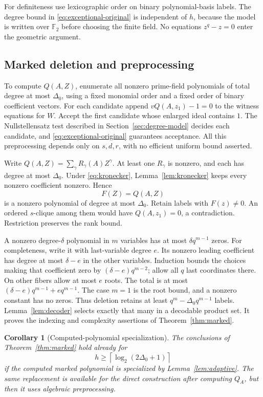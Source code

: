 \documentclass[11pt,a4paper]{article}
\newcommand{\F}{\mathbb F}
\newtheorem{corollary}[theorem]{Corollary}
\theoremstyle{definition}
\theoremstyle{remark}
\numberwithin{equation}{section}
\begin{document}
For definiteness use lexicographic order on binary polynomial-basis labels. The degree bound in \eqref{eq:exceptional-original} is independent of $h$, because the model is written over $\F_2$ before choosing the finite field. No equations $z^q-z=0$ enter the geometric argument.

\subsection{Marked deletion and preprocessing}
To compute $Q(A,Z)$, enumerate all nonzero prime-field polynomials of total degree at most $\Delta_0$, using a fixed monomial order and a fixed order of binary coefficient vectors. For each candidate append $vQ(A,z_1)-1=0$ to the witness equations for $W$. Accept the first candidate whose enlarged ideal contains $1$. The Nullstellensatz test described in Section~\ref{sec:degree-model} decides each candidate, and \eqref{eq:exceptional-original} guarantees acceptance. All this preprocessing depends only on $s,d,r$, with no efficient uniform bound asserted.

Write $Q(A,Z)=\sum_\gamma R_\gamma(A)Z^\gamma$. At least one $R_\gamma$ is nonzero, and each has degree at most $\Delta_0$. Under \eqref{eq:kronecker}, Lemma~\ref{lem:kronecker} keeps every nonzero coefficient nonzero. Hence
\[
F(Z)=Q(A,Z)
\]
is a nonzero polynomial of degree at most $\Delta_0$. Retain labels with $F(z)\ne0$. An ordered $s$-clique among them would have $Q(A,z_1)=0$, a contradiction. Restriction preserves the rank bound.

A nonzero degree-$\delta$ polynomial in $m$ variables has at most $\delta q^{m-1}$ zeros. For completeness, write it with last-variable degree $e$. Its nonzero leading coefficient has degree at most $\delta-e$ in the other variables. Induction bounds the choices making that coefficient zero by $(\delta-e)q^{m-2}$; allow all $q$ last coordinates there. On other fibers allow at most $e$ roots. The total is at most $(\delta-e)q^{m-1}+eq^{m-1}$. The case $m=1$ is the root bound, and a nonzero constant has no zeros. Thus deletion retains at least $q^m-\Delta_0q^{m-1}$ labels. Lemma~\ref{lem:decoder} selects exactly that many in a decodable product set. It proves the indexing and complexity assertions of Theorem~\ref{thm:marked}.

\begin{corollary}[Computed-polynomial specialization]\label{cor:adaptive-marked}
The conclusions of Theorem~\ref{thm:marked} hold already for
\[
h\ge\left\lceil\log_2(2\Delta_0+1)\right\rceil
\]
if the computed marked polynomial is specialized by Lemma~\ref{lem:adaptive}. The same replacement is available for the direct construction after computing $Q_A$, but then it uses algebraic preprocessing.
\end{corollary}
\end{document}
